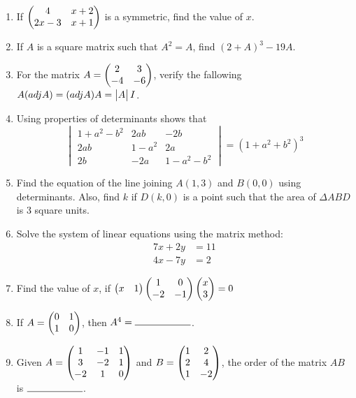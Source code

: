 \documentclass{article}
\begin{document}
\begin{enumerate}

    \item If $\begin{pmatrix}4 & x+2 \\ 2x-3 & x+1\end{pmatrix}$ is a symmetric, find the value of $x$.
    
    \item If $A$ is a square matrix such that $A^2 = A$, find $(2+A)^3 - 19A$.

    \item For the matrix $A = \begin{pmatrix}2 & 3 \\ -4 & -6\end{pmatrix}$, verify the fallowing $A(adj A) = (adj A)A = \begin{vmatrix}A\end{vmatrix}I$.

    \item Using properties of determinants shows that
	    \[
    		\begin{vmatrix}
        		1 + a^2 - b^2 & 2ab & -2b \\
        		2ab & 1 - a^2 & 2a \\
        		2b & -2a & 1 - a^2 - b^2
    		\end{vmatrix} = (1 + a^2 + b^2)^3
	    \]

    \item Find the equation of the line joining $A(1, 3)$ and $B(0, 0)$ using determinants. Also, find $k$ if $D(k, 0)$ is a point such that the area of $\Delta{ABD}$ is $3$ square units.
    
    \item Solve the system of linear equations using the matrix method:
    \begin{align*}
        7x + 2y &= 11 \\
        4x - 7y &= 2
    \end{align*}
    
    \item Find the value of $x$, if
    $\begin{pmatrix}x & 1\end{pmatrix}
    \begin{pmatrix}1 & 0 \\ -2 & -1\end{pmatrix}
    \begin{pmatrix}x \\ 3\end{pmatrix} = 0$
    
    \item If $A = \begin{pmatrix}0 & 1 \\ 1 & 0\end{pmatrix}$, then $A^4 = \rule{2cm}{0.15mm}$.

    \item Given $A = \begin{pmatrix}1 & -1 & 1 \\ 3 & -2 & 1 \\ -2 & 1 & 0\end{pmatrix}$ and
    $B = \begin{pmatrix}1 & 2 \\ 2 & 4 \\ 1 & -2\end{pmatrix}$, the order of the matrix $AB$ is $\rule{2cm}{0.15mm}$.
    

\end{enumerate}
\end{document}
